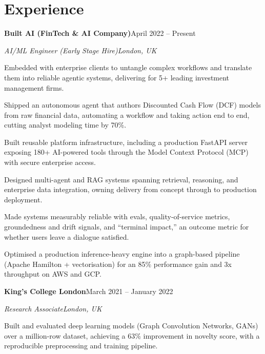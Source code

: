 \documentclass[10pt,a4paper]{article}
\newcommand{\entry}[4]{%
  {\color{company}\bfseries #1}\hfill {\color{muted}#2}\par
  \vspace{1pt}
  {\itshape #3}\hfill {\color{muted}\itshape #4}\par
  \vspace{3pt}%
}
\begin{document}
\section{Experience}
\entry{Built AI (FinTech \& AI Company)}{April 2022 -- Present}{AI/ML Engineer (Early Stage Hire)}{London, UK}
\begin{tight}
  \item Embedded with enterprise clients to untangle complex workflows and translate them into reliable agentic systems, delivering for 5+ leading investment management firms.
  \item Shipped an autonomous agent that authors Discounted Cash Flow (DCF) models from raw financial data, automating a workflow and taking action end to end, cutting analyst modeling time by 70\%.
  \item Built reusable platform infrastructure, including a production FastAPI server exposing 180+ AI-powered tools through the Model Context Protocol (MCP) with secure enterprise access.
  \item Designed multi-agent and RAG systems spanning retrieval, reasoning, and enterprise data integration, owning delivery from concept through to production deployment.
  \item Made systems measurably reliable with evals, quality-of-service metrics, groundedness and drift signals, and ``terminal impact,'' an outcome metric for whether users leave a dialogue satisfied.
  \item Optimised a production inference-heavy engine into a graph-based pipeline (Apache Hamilton + vectorisation) for an 85\% performance gain and 3x throughput on AWS and GCP.
\end{tight}

\entry{King's College London}{March 2021 -- January 2022}{Research Associate}{London, UK}
\begin{tight}
  \item Built and evaluated deep learning models (Graph Convolution Networks, GANs) over a million-row dataset, achieving a 63\% improvement in novelty score, with a reproducible preprocessing and training pipeline.
\end{tight}

\end{document}
